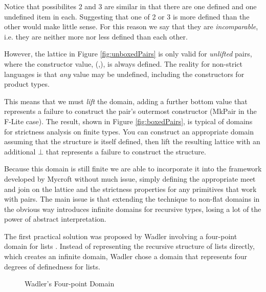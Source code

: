 Notice that possibilites 2 and 3 are similar in that there are one defined and
one undefined item in each. Suggesting that one of 2 or 3 is more defined than
the other would make little sense.  For this reason we say that they are
\emph{incomparable}, i.e. they are neither more nor less defined than each
other.

However, the lattice in Figure \ref{fig:unboxedPairs} is only valid for
\emph{unlifted} pairs, where the constructor value, \<(,)\>, is always defined.
The reality for non-strict languages is that \emph{any} value may be undefined,
including the constructors for product types.

This means that we must \emph{lift} the domain, adding a further bottom value
that represents a failure to construct the pair's outermost constructor
(\<MkPair\> in the F-Lite case). The result, shown in Figure
\ref{fig:boxedPairs}, is typical of domains for strictness analysis on finite
types. You can construct an appropriate domain assuming that the structure is
itself defined, then lift the resulting lattice with an additional $\bot$ that
represents a failure to construct the structure.

Because this domain is still finite we are able to incorporate it into the
framework developed by Mycroft without much issue, simply defining the
appropriate \<meet\> and \<join\> on the lattice and the strictness properties
for any primitives that work with pairs. The main issue is that extending the
technique to non-flat domains in the obvious way introduces infinite domains
for recursive types, losing a lot of the power of abstract interpretation.

The first practical solution was proposed by Wadler involving a four-point
domain for lists \citep{wadler1987strictness}. Instead of representing the
recursive structure of lists directly, which creates an infinite domain, Wadler
chose a domain that represents four degrees of definedness for lists.

\pagebreak

\begin{figure}[t]
\centering
{}
\caption{Wadler's Four-point Domain}
\label{fig:listDomain}
\end{figure}

